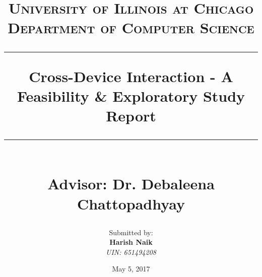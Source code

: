 \documentclass[a4paper,12pt,titlepage]{article}
\title{
  \textsc{\LARGE University of Illinois at Chicago}\\[1.5cm]
  \textsc{\large Department of Computer Science}\\[1.5cm]
  \rule{\textwidth}{1.5pt}
  \huge{\textbf{Cross-Device Interaction - A Feasibility \&
      Exploratory Study Report}} \\
  \rule{\textwidth}{1.5pt}\\[1cm]
  \LARGE{Advisor: \textbf{Dr. Debaleena Chattopadhyay}}\\[5.5cm]
  \author{Submitted by:\\[0.5cm]
    \Large{\textbf{Harish Naik}}\\
    \large{\emph{UIN: 651494208}}
  }  
}
\date{May 5, 2017}
\begin{document}
\maketitle
\thispagestyle{empty}

\tableofcontents
\thispagestyle{empty}
\pagebreak






\begin{footnotesize}
  
  
\end{footnotesize}
\end{document}
